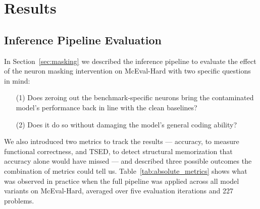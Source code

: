 \documentclass[mscthesis]{usiinfthesis}
\begin{document}
\chapter{Results}
\section{Inference Pipeline Evaluation}
\label{sec:inference_pip_eval}
In Section~\ref{sec:masking} we described the inference pipeline to evaluate the effect of the neuron masking intervention on McEval-Hard with two specific questions in mind:
\begin{enumerate}
	\item[(1)] Does zeroing out the benchmark-specific neurons bring the contaminated model's performance back in line with the clean baselines?
	\item[(2)] Does it do so without damaging the model's general coding ability?
\end{enumerate}
We also introduced two metrics to track the results --- accuracy, to measure
functional correctness, and TSED, to detect structural memorization that accuracy alone
would have missed --- and described three possible outcomes the combination of metrics could
tell us. Table~\ref{tab:absolute_metrics} shows what was observed in practice when the full pipeline was applied across all model variants on McEval-Hard, averaged over five evaluation iterations and 227 problems.
 
\begin{table}[h]
\centering
\caption{Absolute accuracy and mean TSED scores on McEval-Hard (averaged over 5 iterations and 227 problems for both metrics).}
\label{tab:absolute_metrics}
\end{table}
 
\end{document}
